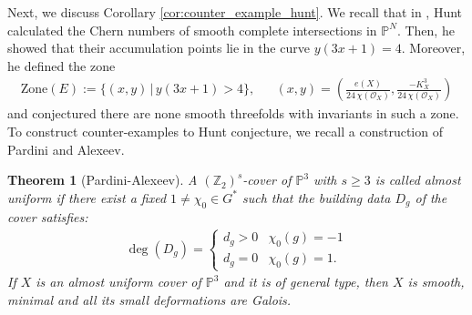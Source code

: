 \documentclass[12pt,twoside,]{amsart}
\theoremstyle{plain}
\newtheorem{theorem}{Theorem}[subsection]
\theoremstyle{definition}
\begin{document}
Next, we discuss Corollary \ref{cor:counter_example_hunt}.
We recall that in \cite[Sec 7.2.3-7.2.4]{huntthreefolds89}, 
Hunt calculated the Chern numbers of smooth complete intersections in $\mathbb{P}^N$. Then, he showed that  their accumulation points lie in the curve $y(3x+1) = 4$. Moreover, he defined the zone
\begin{align*}
  \text{Zone}(E):=
  \{(x,y) \, | \, 
  y(3x+1) > 4 \},
  &&
  (x,y) =  \left(
\frac{e(X)}{24\,\chi(\mathcal{O}_X)} , 
    \frac{-K_X^3}{24\,\chi(\mathcal{O}_X)} \right)
\end{align*}
and conjectured there are none smooth threefolds with invariants in such a zone.  To construct counter-examples to Hunt conjecture, we recall a construction of Pardini and Alexeev.
\begin{theorem}[Pardini-Alexeev]
A $(\mathbb{Z}_2)^s$-cover of $\mathbb{P}^3$ with $s\geq 3$ is called \emph{almost uniform} if there exist a fixed $1 \neq \chi_0 \in G^*$ such that the building data $D_g$ of the cover satisfies:
\begin{align*}
 \deg (D_g)  = \begin{cases}
     d_g > 0 & \chi_0(g) = - 1 \\
     d_g = 0 & \chi_0(g) = 1.
 \end{cases}   
\end{align*}
If $X$ is an almost uniform cover of $\mathbb{P}^3$ and it is of general type, then $X$ is smooth, minimal and  all its small deformations are Galois.
\end{theorem}
\end{document}
